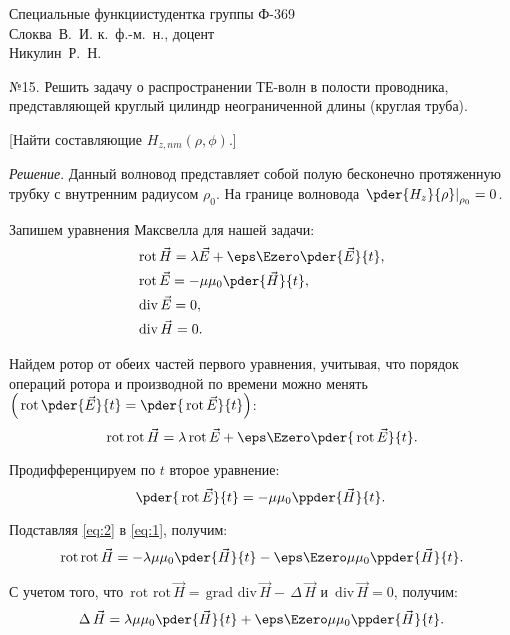 




\renewcommand{\div}{\mathrm{\,div\,}}
\newcommand{\grad}{\mathrm{\,grad\,}}
\newcommand{\rot}{\mathrm{\,rot\,}}
\renewcommand{\L}{\,\Delta\,}


{Специальные функции}{студентка группы Ф-369\\Слоква~В.~И.}
{к.~ф.-м.~н., доцент\\Никулин~Р.~Н.}{\!\!}

№15. Решить задачу о распространении ТЕ-волн в полости проводника,
представляющей круглый цилиндр неограниченной длины (круглая труба).
    
[Найти составляющие \( H_{z, nm}(\rho, \phi)\).]

\vspace*{2em}
\emph{Решение}. Данный волновод представляет собой полую бесконечно
протяженную трубку с внутренним радиусом \( \rho_0 \).
На границе волновода \( \left.\pder{H_z}{\rho}\right|_{\rho_0} = 0 \).

Запишем уравнения Максвелла для нашей задачи:
\begin{align*}
    & \rot\vec{H} = \lambda\vec{E} + \eps\Ezero\pder{\vec{E}}{t}, \\
    & \rot\vec{E} = -\mu\mu_0\pder{\vec{H}}{t}, \\
    & \div\vec{E} = 0, \\
    & \div\vec{H} = 0.
\end{align*}

Найдем ротор от обеих частей первого уравнения, учитывая, что порядок операций
ротора и производной по времени можно менять
\( \left(\rot\pder{\vec{E}}{t}= \pder{\rot\vec{E}}{t}\right) \):
\begin{equation}
    \rot\!\rot\vec{H} = \lambda\rot\vec{E} + \eps\Ezero\pder{\rot\vec{E}}{t}.
    \label{eq:1}
\end{equation}

Продифференцируем по \( t \) второе уравнение:
\begin{equation}
    \pder{\rot\vec{E}}{t} = -\mu\mu_0\ppder{\vec{H}}{t}.
    \label{eq:2}
\end{equation}

Подставляя \eqref{eq:2} в \eqref{eq:1}, получим:
\[
    \rot\!\rot\vec{H} = -\lambda\mu\mu_0\pder{\vec{H}}{t} - \eps\Ezero\mu\mu_0
    \ppder{\vec{H}}{t}.
\]

С учетом того, что \( \rot\!\rot\vec{H} = \grad\div\vec{H} - \L\vec{H} \) и
\( \div\vec{H} = 0 \), получим:
\begin{equation}
    \L\vec{H} = \lambda\mu\mu_0\pder{\vec{H}}{t} + \eps\Ezero\mu\mu_0
    \ppder{\vec{H}}{t}.
    \label{eq:4}
\end{equation}

